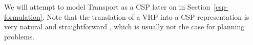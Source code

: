 We will attempt to model Transport as a CSP later on in Section~\ref{csp-formulation}.
Note that the translation of a VRP into a CSP representation is very natural and straightforward \citep[Solution Methods / Constraint Programming]{ResearchGroup2013}, which is usually not the case for planning problems.
